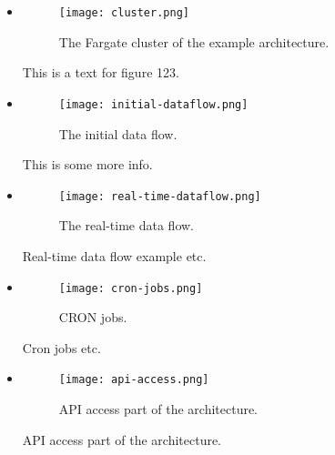 \begin{itemize}
  \item \begin{figure}[!ht]
          \centering
          \texttt{[image: cluster.png]}
          \caption{The Fargate cluster of the example architecture.}
          \label{fig:cluster}
        \end{figure}

        This is a text for figure 123.

  \item  \begin{figure}[!ht]
          \centering
          \texttt{[image: initial-dataflow.png]}
          \caption{The initial data flow.}
          \label{fig:initial-flow}
        \end{figure}

        This is some more info.

  \item  \begin{figure}[!ht]
          \centering
          \texttt{[image: real-time-dataflow.png]}
          \caption{The real-time data flow.}
          \label{fig:realtime-flow}
        \end{figure}

        Real-time data flow example etc.

  \item \begin{figure}[!ht]
          \centering
          \texttt{[image: cron-jobs.png]}
          \caption{CRON jobs.}
          \label{fig:cron}
        \end{figure}

        Cron jobs etc.

  \item \begin{figure}[!ht]
          \centering
          \texttt{[image: api-access.png]}
          \caption{API access part of the architecture.}
          \label{fig:api-access}
        \end{figure}

        API access part of the architecture.

\end{itemize}



